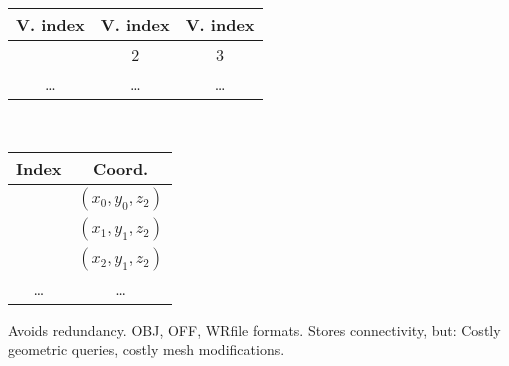 \begin{compactdesc}
		\begin{center}
			\begin{tabular}[]{c@{\hskip +0.3ex}c@{\hskip +0.3ex}c@{\hskip +0.3ex}}
				V. index&V. index&V. index\\
				\toprule
				\!\!\!1&2&3\\
				\!\!\!\ldots&\ldots&\ldots\\
				\bottomrule
			\end{tabular}
		\end{center}\hfill\\
		\begin{center}
			\begin{tabular}[]{c@{\hskip +0.3ex}c@{\hskip +0.3ex}}
				Index&Coord.\\
				\toprule
				\!\!\!0&$(x_0,y_0,z_2)$\\
				\!\!\!1&$(x_1,y_1,z_2)$\\
				\!\!\!2&$(x_2,y_1,z_2)$\\
				\ldots&\ldots\\
				\bottomrule
			\end{tabular}
		\end{center}
		Avoids redundancy. OBJ, OFF, WRfile formats. Stores connectivity, but: Costly geometric queries, costly mesh modifications.
\end{compactdesc}
